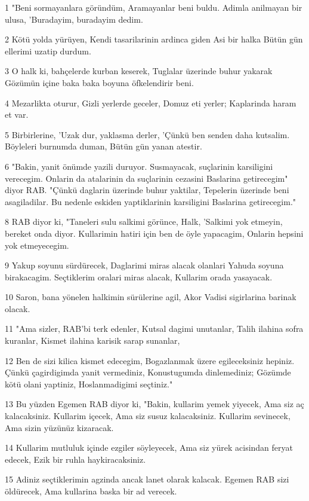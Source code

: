 \par 1 "Beni sormayanlara göründüm, Aramayanlar beni buldu. Adimla anilmayan bir ulusa, 'Buradayim, buradayim dedim.
\par 2 Kötü yolda yürüyen, Kendi tasarilarinin ardinca giden Asi bir halka Bütün gün ellerimi uzatip durdum.
\par 3 O halk ki, bahçelerde kurban keserek, Tuglalar üzerinde buhur yakarak Gözümün içine baka baka boyuna öfkelendirir beni.
\par 4 Mezarlikta oturur, Gizli yerlerde geceler, Domuz eti yerler; Kaplarinda haram et var.
\par 5 Birbirlerine, 'Uzak dur, yaklasma derler, 'Çünkü ben senden daha kutsalim. Böyleleri burnumda duman, Bütün gün yanan atestir.
\par 6 "Bakin, yanit önümde yazili duruyor. Susmayacak, suçlarinin karsiligini verecegim. Onlarin da atalarinin da suçlarinin cezasini Baslarina getirecegim" diyor RAB. "Çünkü daglarin üzerinde buhur yaktilar, Tepelerin üzerinde beni asagiladilar. Bu nedenle eskiden yaptiklarinin karsiligini Baslarina getirecegim."
\par 8 RAB diyor ki, "Taneleri sulu salkimi görünce, Halk, 'Salkimi yok etmeyin, bereket onda diyor. Kullarimin hatiri için ben de öyle yapacagim, Onlarin hepsini yok etmeyecegim.
\par 9 Yakup soyunu sürdürecek, Daglarimi miras alacak olanlari Yahuda soyuna birakacagim. Seçtiklerim oralari miras alacak, Kullarim orada yasayacak.
\par 10 Saron, bana yönelen halkimin sürülerine agil, Akor Vadisi sigirlarina barinak olacak.
\par 11 "Ama sizler, RAB'bi terk edenler, Kutsal dagimi unutanlar, Talih ilahina sofra kuranlar, Kismet ilahina karisik sarap sunanlar,
\par 12 Ben de sizi kilica kismet edecegim, Bogazlanmak üzere egileceksiniz hepiniz. Çünkü çagirdigimda yanit vermediniz, Konustugumda dinlemediniz; Gözümde kötü olani yaptiniz, Hoslanmadigimi seçtiniz."
\par 13 Bu yüzden Egemen RAB diyor ki, "Bakin, kullarim yemek yiyecek, Ama siz aç kalacaksiniz. Kullarim içecek, Ama siz susuz kalacaksiniz. Kullarim sevinecek, Ama sizin yüzünüz kizaracak.
\par 14 Kullarim mutluluk içinde ezgiler söyleyecek, Ama siz yürek acisindan feryat edecek, Ezik bir ruhla haykiracaksiniz.
\par 15 Adiniz seçtiklerimin agzinda ancak lanet olarak kalacak. Egemen RAB sizi öldürecek, Ama kullarina baska bir ad verecek.
